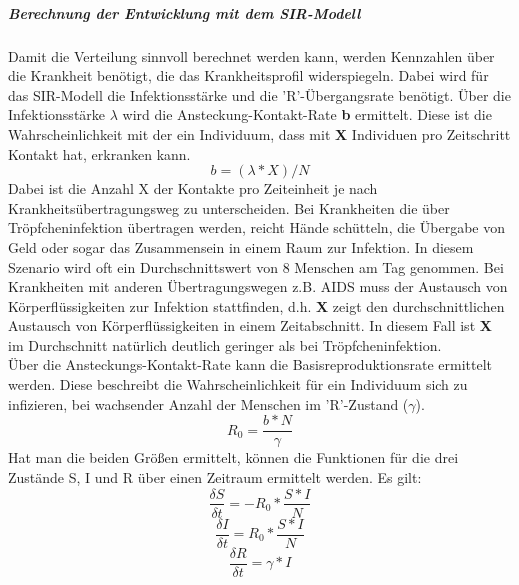 \subparagraph{Berechnung der Entwicklung mit dem SIR-Modell}
Damit die Verteilung sinnvoll berechnet werden kann, werden Kennzahlen über die Krankheit benötigt, die das Krankheitsprofil widerspiegeln. Dabei wird für das SIR-Modell die Infektionsstärke und die 'R'-Übergangsrate benötigt.
Über die Infektionsstärke $\lambda$ wird die Ansteckung-Kontakt-Rate \textbf{b} ermittelt. Diese ist die Wahrscheinlichkeit mit der ein Individuum, dass mit \textbf{X} Individuen pro Zeitschritt Kontakt hat, erkranken kann.
\begin{equation}
b = ( \lambda * X ) / N
\end{equation}
Dabei ist die Anzahl X der Kontakte pro Zeiteinheit je nach Krankheitsübertragungsweg zu unterscheiden. Bei Krankheiten die über Tröpfcheninfektion übertragen werden, reicht Hände schütteln, die Übergabe von Geld oder sogar das Zusammensein in einem Raum zur Infektion. In diesem Szenario wird oft ein Durchschnittswert von 8 Menschen am Tag genommen.%
Bei Krankheiten mit anderen Übertragungswegen z.B. AIDS muss der Austausch von Körperflüssigkeiten zur Infektion stattfinden, d.h. \textbf{X} zeigt den durchschnittlichen Austausch von Körperflüssigkeiten in einem Zeitabschnitt. In diesem Fall ist \textbf{X} im Durchschnitt natürlich deutlich geringer als bei Tröpfcheninfektion.\\
Über die Ansteckungs-Kontakt-Rate kann die Basisreproduktionsrate ermittelt werden. Diese beschreibt die Wahrscheinlichkeit für ein Individuum sich zu infizieren, bei wachsender Anzahl der Menschen im 'R'-Zustand ($\gamma$).
\begin{equation}
R_0 = \frac{ b * N }{ \gamma }
\end{equation}
Hat man die beiden Größen ermittelt, können die Funktionen für die drei Zustände S, I und R über einen Zeitraum ermittelt werden. 
Es gilt:
\begin{equation}
\frac{ \delta S }{ \delta t } = -R_0 * \frac{S * I}{N}
\end{equation}
\begin{equation}
\frac{\delta I }{\delta t} = R_0 * \frac{S * I}{N}
\end{equation}
\begin{equation}
\frac{\delta R }{\delta t} = \gamma * I
\end{equation}


